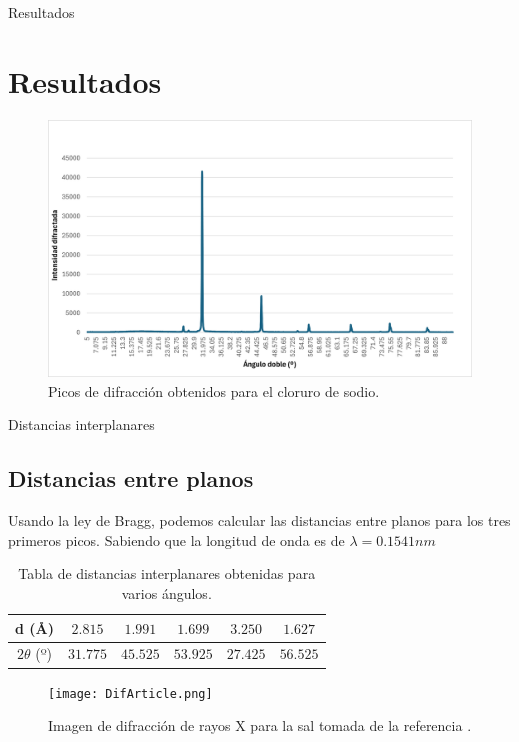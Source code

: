 \documentclass{beamer}
\begin{document}
\begin{frame}{Resultados}
    \section{Resultados}
    \begin{figure}[h!]
        \begin{center}
            \includegraphics[max width=0.9\linewidth]{DifNaCl.png}
        \end{center}
        \caption{Picos de difracción obtenidos para el cloruro de sodio.}
    \end{figure}
\end{frame}
\begin{frame}{Distancias interplanares}
    \subsection{Distancias entre planos}
    Usando la ley de Bragg, podemos calcular las distancias entre planos para los tres primeros picos. Sabiendo que la longitud de onda es de $\lambda = 0.1541nm$
    \begin{table}
        \begin{center}
            \begin{tabular}{|c|c|c|c|c|c|}
                \hline
                d (\r{A}) & $2.815$ & $1.991$ & $1.699$ & $3.250$ & $1.627$ \\ \hline
                $2\theta$ (º) & $31.775$ & $45.525$ & $53.925$ & $27.425$ & $56.525$ \\ \hline
            \end{tabular}
        \end{center}
        \caption{Tabla de distancias interplanares obtenidas para varios ángulos.}
    \end{table}
    \begin{figure}[h!]
        \begin{center}
            \texttt{[image: DifArticle.png]}
        \end{center}
        \caption{Imagen de difracción de rayos X para la sal tomada de la referencia \cite{difArticle}.}
    \end{figure}
\end{frame}
\end{document}
